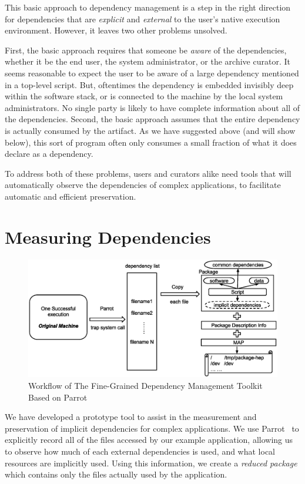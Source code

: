\documentclass{sig-alternate}
\begin{document}
This basic approach to dependency management is a step in the right direction
for dependencies that are \emph{explicit} and \emph{external} to the
user's native execution environment.  However, it leaves two other problems unsolved.

First, the basic approach requires that someone be \emph{aware} of the dependencies,
whether it be the end user, the system administrator, or the archive curator.
It seems reasonable to expect the user to be aware of a large dependency mentioned in a top-level script.
But, oftentimes the dependency is embedded invisibly deep within the software stack,
or is connected to the machine by the local system administrators.  No single party
is likely to have complete information about all of the dependencies.
Second, the basic approach assumes that the entire dependency is actually
consumed by the artifact.  As we have suggested above (and will show below),
this sort of program often only consumes a small fraction of what it does declare
as a dependency.

To address both of these problems, users and curators alike need tools that
will automatically observe the dependencies of complex applications, to
facilitate automatic and efficient preservation.

\section{Measuring Dependencies}

\begin{figure}
\centering
\includegraphics[width=1.6\columnwidth]{workflow-parrot.eps}
\caption{Workflow of The Fine-Grained Dependency Management Toolkit Based on Parrot}
\label{fig:workflow-parrot}
\end{figure}

We have developed a prototype tool to assist in the measurement and preservation
of implicit dependencies for complex applications.
We use Parrot~\cite{thain2005parrot} to explicitly record all
of the files accessed by our example application, allowing us to observe how
much of each external dependencies is used, and what local resources are implicitly used.
Using this information, we create a \emph{reduced package} which contains
only the files actually used by the application.
\end{document}
